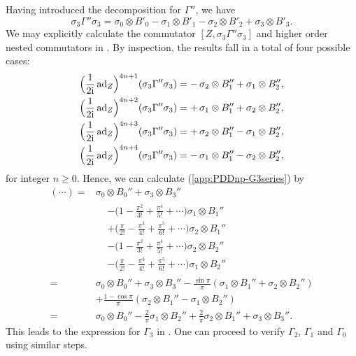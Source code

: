 \documentclass[pra,reprint,superscriptaddress]{revtex4-2}
\begin{document}
Having introduced the decomposition for $\Gamma''$, we have
\begin{equation}
 \sigma_3\Gamma''\sigma_3 = \sigma_0 \otimes B'_0 -\sigma_1 \otimes B'_1
  -\sigma_2 \otimes B'_2 +\sigma_3 \otimes B'_3.
\end{equation}
We may explicitly calculate the commutator $[Z,\sigma_3\Gamma''\sigma_3]$ and higher order nested commutators in . By inspection, the results fall in a total of four possible cases:
\begin{equation}
\begin{aligned}
  \Bigl(\frac{1}{2\mathrm{i}}\operatorname{ad}_Z\Bigr)^{4n+1} (\sigma_3\Gamma''\sigma_3) &= 
 -\, \sigma_2 \otimes B_1'' + \sigma_1\otimes B''_2,\\
   \Bigl(\frac{1}{2\mathrm{i}}\operatorname{ad}_Z\Bigr)^{4n+2} (\sigma_3\Gamma''\sigma_3) &= 
 +\,\sigma_1 \otimes B_1'' + \sigma_2\otimes B''_2,\\
  \Bigl(\frac{1}{2\mathrm{i}}\operatorname{ad}_Z\Bigr)^{4n+3} (\sigma_3\Gamma''\sigma_3) &= 
 +\,\sigma_2 \otimes B_1'' - \sigma_1\otimes B''_2,\\
  \Bigl(\frac{1}{2\mathrm{i}}\operatorname{ad}_Z\Bigr)^{4n+4} (\sigma_3\Gamma''\sigma_3) &= 
 -\, \sigma_1 \otimes B_1'' - \sigma_2\otimes B''_2,\\
\end{aligned}
\end{equation}
for integer $n\ge0$. Hence, we can calculate (\ref{app:PDDnp-G3series}) by 
\begin{equation}
\begin{aligned}
  (\cdots)={} &\sigma_0 \otimes B_0'' + \sigma_3 \otimes B_3''\\
 &\begin{aligned}
  &-\bigl(1-\frac{\pi^2}{3!}+\frac{\pi^4}{5!}+\cdots\bigr) \sigma_1 \otimes B_1''\\
  &+\bigl(\frac{\pi}{2!}-\frac{\pi^3}{4!}+\frac{\pi^5}{6!}+\cdots\bigr) \sigma_2 \otimes B_1''\\
  &-\bigl(1-\frac{\pi^2}{3!}+\frac{\pi^4}{5!}+\cdots\bigr) \sigma_2 \otimes B_2''\\
  &-\bigl(\frac{\pi}{2!}-\frac{\pi^3}{4!}+\frac{\pi^5}{6!}+\cdots\bigr)\sigma_1 \otimes B_2''
 \end{aligned}\\
 ={} & \sigma_0 \otimes B_0'' + \sigma_3 \otimes B_3''-\frac{\sin\pi}{\pi} (\sigma_1 \otimes B_1'' + \sigma_2 \otimes B_2'')\\
&+\frac{1-\cos\pi}{\pi} (\sigma_2 \otimes B_1'' - \sigma_1 \otimes B_2'')\\
={}&\sigma_0 \otimes B_0'' 
-\frac{2}{\pi}  \sigma_1 \otimes B_2''
+\frac{2}{\pi} \sigma_2 \otimes B_1'' + \sigma_3 \otimes B_3''.
\end{aligned}
\end{equation}
This leads to the expression for $\Gamma_3$ in .
One can proceed to verify $\Gamma_2$, $\Gamma_1$ and $\Gamma_0$ using similar steps. 
\end{document}
